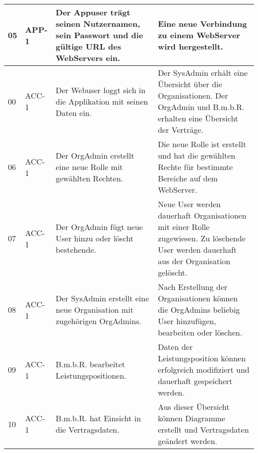 \begin{longtable}[c]{|p{1cm}|p{3cm}|p{4cm}|p{6cm}|}
    05           & APP-1                      & Der Appuser trägt seinen Nutzernamen, sein Passwort und die gültige URL des WebServers ein.                        & Eine neue Verbindung zu einem WebServer wird hergestellt.                                                                                                                  \\ \hline
    00           & ACC-1                      & Der Webuser loggt sich in die Applikation mit seinen Daten ein.                                                    & Der SysAdmin erhält eine Übersicht über die Organisationen. Der OrgAdmin und B.m.b.R. erhalten eine Übersicht der Verträge. \\ \hline
    06           & ACC-1                      & Der OrgAdmin erstellt eine neue Rolle mit gewählten Rechten.                                                       & Die neue Rolle ist erstellt und hat die gewählten Rechte für bestimmte Bereiche auf dem WebServer.                                                                         \\ \hline
    07           & ACC-1                      & Der OrgAdmin fügt neue User hinzu oder löscht bestehende.                                                        & Neue User werden dauerhaft Organisationen mit einer Rolle zugewiesen. Zu löschende User werden dauerhaft aus der Organisation gelöscht.                                \\ \hline
    08           & ACC-1                      & Der SysAdmin erstellt eine neue Organisation mit zugehörigen OrgAdmins.                                            & Nach Erstellung der Organisationen können die OrgAdmins beliebig User hinzufügen, bearbeiten oder löschen.                                                               \\ \hline
    09           & ACC-1                      & B.m.b.R. bearbeitet Leistungspositionen.                                                                           & Daten der Leistungsposition können erfolgreich modifiziert und dauerhaft gespeichert werden.                                                                               \\ \hline
    10           & ACC-1                      & B.m.b.R. hat Einsicht in die Vertragsdaten.                                                                        & Aus dieser Übersicht können Diagramme erstellt und Vertragsdaten geändert werden.                                                                                          \\ \hline

\end{longtable}
